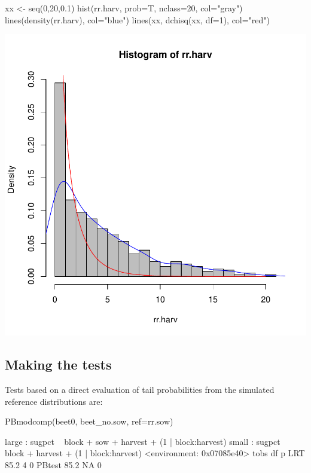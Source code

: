 \documentclass[12pt]{article}
\begin{document}
\begin{Schunk}
\begin{Sinput}
 xx <- seq(0,20,0.1)
 hist(rr.harv, prob=T, nclass=20, col="gray")
 lines(density(rr.harv), col="blue")
 lines(xx, dchisq(xx, df=1), col="red")
\end{Sinput}
\end{Schunk}
\includegraphics{figures/MMtest-012}



\subsection{Making the tests}
\label{sec:making-tests}

Tests based on a direct evaluation of tail probabilities from the
simulated reference distributions are:

\begin{Schunk}
\begin{Sinput}
 PBmodcomp(beet0, beet_no.sow, ref=rr.sow)
\end{Sinput}
\begin{Soutput}
large : sugpct ~ block + sow + harvest + (1 | block:harvest)
small : sugpct ~ block + harvest + (1 | block:harvest)
<environment: 0x07085e40>
       tobs df p
LRT    85.2  4 0
PBtest 85.2 NA 0
\end{Soutput}
\end{Schunk}
\end{document}
